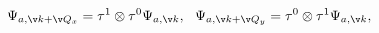 \begin{equation}
 \Psi_{a,\v k+\v Q_x} = \tau^1\otimes \tau^0 \Psi_{a,\v k},\ \ 
 \Psi_{a,\v k+\v Q_y} = \tau^0\otimes \tau^1 \Psi_{a,\v k},\ \ 
\end{equation}

